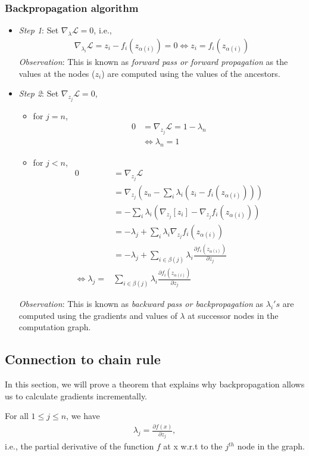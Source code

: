 \subsubsection*{Backpropagation algorithm}
\begin{itemize}
\item \textit{Step 1}: Set $\nabla_{\lambda} \mathcal{L} = 0$, i.e.,
\begin{align}
\nabla_{\lambda_i} \mathcal{L} = z_i - f_i(z_{\alpha(i)}) = 0 \Leftrightarrow z_i = f_i(z_{\alpha(i)})
\end{align}
\textit{Observation}: This is known as \textit{forward pass or forward propagation} as the values at the nodes ($z_i$) are computed using the values of the ancestors.
\item \textit{Step 2}: Set $\nabla_{z_j} \mathcal{L} = 0$, 
\begin{itemize}
\item for $j = n$, 
\begin{align*}
0 &= \nabla_{z_j} \mathcal{L} = 1 - \lambda_n \\
&\Leftrightarrow \lambda_n = 1
\end{align*}
\item for $j < n$,
\begin{align}
0  &= \nabla_{z_j} \mathcal{L} \nonumber \\
&=  \nabla_{z_j} (z_n - \sum_i \lambda_i (z_i - f_i(z_{\alpha(i)}))) \nonumber \\
&= - \sum_i \lambda_i (\nabla_{z_j} [z_i] - \nabla_{z_j} f_i(z_{\alpha(i)})) \nonumber \\
&= -\lambda_j + \sum_i \lambda_i \nabla_{z_j} f_i(z_{\alpha(i)}) \nonumber \\
&= -\lambda_j + \sum_{i \in \beta(j)} \lambda_i \frac{\partial f_i(z_{\alpha(i)})}{\partial z_j} \nonumber \\
\Leftrightarrow \lambda_j =& \sum_{i \in \beta(j)} \lambda_i \frac{\partial f_i(z_{\alpha(i)})}{\partial z_j} \nonumber
\end{align}
\end{itemize}
\textit{Observation}: This is known as \textit{backward pass or backpropagation} as $\lambda_i's$ are computed using the gradients and values of $\lambda$ at successor nodes in the computation graph. 
\end{itemize}


\subsection{Connection to chain rule}
In this section, we will prove a theorem that explains why backpropagation allows us to calculate gradients incrementally.
\begin{theorem}
For all $1 \leq j \leq n$, we have
\begin{align*}
\lambda_j = \frac{\partial f(x)}{\partial z_j},
\end{align*}
i.e., the partial derivative of the function $f$ at x w.r.t to the $j^{th}$ node in the graph.
\end{theorem}

